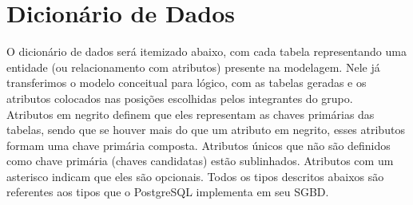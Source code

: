 \documentclass[a4paper, 11pt]{article}
\begin{document}
\newpage
\section*{Dicionário de Dados}
O dicionário de dados será itemizado abaixo, com cada tabela representando uma entidade (ou relacionamento com atributos) presente na modelagem. Nele já transferimos o modelo conceitual para lógico, com as tabelas geradas e os atributos colocados nas posições escolhidas pelos integrantes do grupo. \\
Atributos em negrito definem que eles representam as chaves primárias das tabelas, sendo que se houver mais do que um atributo em negrito, esses atributos formam uma chave primária composta. Atributos únicos que não são definidos como chave primária (chaves candidatas) estão sublinhados. Atributos com um asterisco indicam que eles são opcionais. Todos os tipos descritos abaixos são referentes aos tipos que o PostgreSQL implementa em seu SGBD.

\vspace{1cm}
\end{document}
